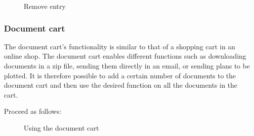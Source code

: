\begin{figure}[H]
\caption{Remove entry}
\end{figure}


\subsubsection{Document cart}
\label{bkm:Ref201705445}

The document cart's functionality is similar to that of a shopping cart in an online shop. The document cart enables different functions such as downloading documents in a zip file, sending them directly in an email, or sending plans to be plotted. It is therefore possible to add a certain number of documents to the document cart and then use the desired function on all the documents in the cart.

\vspace{\baselineskip}

Proceed as follows:

\begin{figure}[H]
\caption{Using the document cart}
\end{figure}

